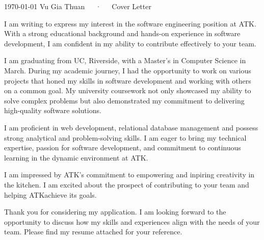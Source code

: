 \documentclass[11pt, a4paper]{derwent-cv}
\def\companyname{ATK}
\def\companystatement{empowering and inpiring creativity in the kitchen}
\begin{document}
\makedercvheader[C]

\makecvfooter
  {\today}
  {Vu Gia Thuan~~~·~~~Cover Letter}
  {}

\makelettertitle

\begin{cvletter}
  I am writing to express my interest in the software engineering position at \companyname. With a strong educational background and hands-on experience in software development, I am confident in my ability to contribute effectively to your team.

I am graduating from UC, Riverside, with a Master's in Computer Science in March. During my academic journey, I had the opportunity to work on various projects that honed my skills in software development and working with others on a common goal. My university coursework not only showcased my ability to solve complex problems but also demonstrated my commitment to delivering high-quality software solutions.

  I am proficient in web development, relational database management and possess strong analytical and problem-solving skills. I am eager to bring my technical expertise, passion for software development, and commitment to continuous learning in the dynamic environment at \companyname.

I am impressed by \companyname's commitment to \companystatement. I am excited about the prospect of contributing to your team and helping \companyname achieve its goals.

Thank you for considering my application. I am looking forward to the opportunity to discuss how my skills and experiences align with the needs of your team. Please find my resume attached for your reference.

\end{cvletter}
\makederletterclosing
\end{document}
